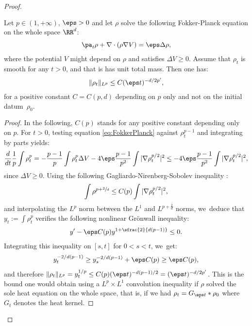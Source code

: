 \begin{proof}
\begin{lemma}\label{lemma:LpBoundRho}
Let $p \in (1,+\infty)$, $\eps > 0$ and let $\rho$ solve the following Fokker-Planck equation on the whole space $\RR^d$:
\begin{equation}\label{eq:FokkerPlanck}
\pa_t \rho + \nabla \cdot (\rho \nabla V) = \eps \Delta \rho,
\end{equation}
where the potential $V$ might depend on $\rho$ and satisfies $\Delta V \geq 0$. Assume that $\rho_t$ is smooth for any $t>0$, and that is has unit total mass. Then one has:
\[
\|\rho_t\|_{L^p} \leq C(\eps t)^{-d/2p'},
\]
for a positive constant $C=C(p,d)$ depending on $p$ only and not on the initial datum~$\rho_0$.
\end{lemma}
\begin{proof}
In the following, $C(p)$ stands for any positive constant depending only on $p$. For $t>0$, testing equation \eqref{eq:FokkerPlanck} against $\rho_t^{p-1}$ and integrating by parts yields:
\[
\frac{d}{dt} \frac 1p \int \rho_t^p = - \frac{p-1}{p} \int \rho_t^p \Delta V - 4 \eps \frac{p-1}{p^2} \int |\nabla \rho_t^{p/2}|^2 \leq - 4 \eps \frac{p-1}{p^2} \int |\nabla \rho_t^{p/2}|^2,
\]
since $\Delta V \geq 0$. Using the following Gagliardo-Nirenberg-Sobolev inequality \cite{gagliardo59, nirenberg59}:
\[
\int \rho^{p+\sfrac 2d} \leq C(p) \int |\nabla \rho_t^{p/2}|^2,
\]
and interpolating the $L^p$ norm between the $L^1$ and $L^{p+\frac 2d}$ norms, we~deduce that $y_t := \int \rho_t^p$ verifies the following nonlinear Grönwall inequality:
\[
y' - \eps C(p) y^{1+\sfrac{2}{d(p-1)}} \leq 0.
\]
Integrating this inequality on $[s,t]$ for $0<s<t$, we~get:
\[
y_t^{-2/d(p-1)} \geq y_s^{-2/d(p-1)} + \eps C(p) \geq \eps C(p),
\]
and therefore $\|\rho_t\|_{L^p} = y_t^{1/p} \leq C(p) (\eps t)^{-d(p-1)/2} = (\eps t)^{-d/2p'}$. This is the bound one would obtain using a $L^p \times L^1$ convolution inequality if $\rho$ solved the sole heat equation on the whole space, that is, if we had $\rho_t = G_{\eps t} * \rho_0$ where $G_t$ denotes the heat kernel.
\end{proof}


\end{proof}

